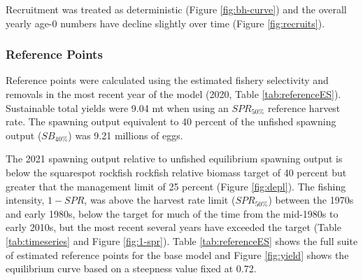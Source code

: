 \documentclass[11pt,
  english,
  a4paper,
]{article}
\begin{document}
Recruitment was treated as deterministic (Figure \ref{fig:bh-curve}) and the overall yearly age-0 numbers have decline slightly over time (Figure \ref{fig:recruits}).

\leavevmode\tagmcend\tagstructend\par


\hypertarget{reference-points}{%
\subsubsection{Reference Points}\label{reference-points}}

\leavevmode\tagmcend\tagstructend


Reference points were calculated using the estimated fishery selectivity and removals in the most recent year of the model (2020, Table \ref{tab:referenceES}). Sustainable total yields were 9.04 mt when using an {\(SPR_{50\%}\)\leavevmode\tagmcend\tagstructend} reference harvest rate. The spawning output equivalent to 40 percent of the unfished spawning output ({\(SB_{40\%}\)\leavevmode\tagmcend\tagstructend}) was 9.21 millions of eggs.

\leavevmode\tagmcend\tagstructend\par


The 2021 spawning output relative to unfished equilibrium spawning output is below the squarespot rockfish rockfish relative biomass target of 40 percent but greater that the management limit of 25 percent (Figure \ref{fig:depl}). The fishing intensity, {\(1-SPR\)\leavevmode\tagmcend\tagstructend}, was above the harvest rate limit ({\(SPR_{50\%}\)\leavevmode\tagmcend\tagstructend}) between the 1970s and early 1980s, below the target for much of the time from the mid-1980s to early 2010s, but the most recent several years have exceeded the target (Table \ref{tab:timeseries} and Figure \ref{fig:1-spr}). Table \ref{tab:referenceES} shows the full suite of estimated reference points for the base model and Figure \ref{fig:yield} shows the equilibrium curve based on a steepness value fixed at 0.72.

\leavevmode\tagmcend\tagstructend\par
\end{document}
